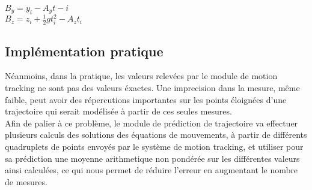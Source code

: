 $B_y = y_i - A_y t-i$\\

$B_z = z_i + \frac{1}{2} g t_i^2 - A_z t_i$\\

\subsection{Implémentation pratique}

Néanmoins, dans la pratique, les valeurs relevées par le module de motion tracking ne sont pas des valeurs éxactes. Une imprecision dans la mesure, même faible, peut avoir des répercutions importantes sur les points éloignées d'une trajectoire qui serait modélisée à partir de ces seules mesures.\\

Afin de palier à ce problème, le module de prédiction de trajectoire va effectuer plusieurs calculs des solutions des équations de mouvements, à partir de différents quadruplets de points envoyés par le système de motion tracking, et utiliser pour sa prédiction une moyenne arithmetique non pondérée sur les différentes valeurs ainsi calculées, ce qui nous permet de réduire l'erreur en augmentant le nombre de mesures.
